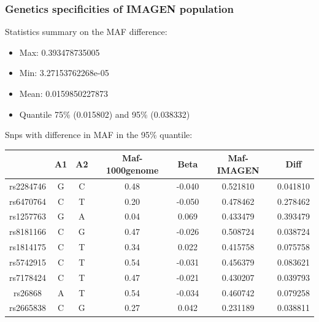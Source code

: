\documentclass[utf8]{beamer}
\begin{document}
\begin{frame}
\frametitle{Genetics specificities of IMAGEN population }

Statistics summary on the MAF difference:
\tiny
\begin{itemize}
\item Max:  0.393478735005
\item Min:  3.27153762268e-05
\item Mean:  0.0159850227873
\item Quantile 75\% (0.015802) and 95\% (0.038332)
\end{itemize}

\vspace{0.5cm}
\normalsize
Snps with difference in MAF in the 95\% quantile:\\
\vspace{0.5cm}
\tiny
\begin{tabular}{|c|c|c|c|c|c|c|}
\hline     &  A1 &  A2 &  Maf-1000genome &   Beta     & Maf-IMAGEN   &   Diff \\
\hline
\hline rs2284746 & G & C & 0.48 &-0.040 & 0.521810 & 0.041810 \\
\hline rs6470764 & C & T & 0.20 &-0.050  &  0.478462 & 0.278462 \\
\hline rs1257763 & G & A & 0.04 & 0.069  &  0.433479 & 0.393479 \\
\hline rs8181166 & C & G & 0.47 &-0.026  &  0.508724 & 0.038724 \\
\hline rs1814175 & C & T & 0.34 & 0.022  &  0.415758 & 0.075758 \\
\hline rs5742915 & C & T & 0.54 &-0.031  &  0.456379 & 0.083621 \\
\hline rs7178424 & C & T & 0.47 &-0.021  &  0.430207 & 0.039793 \\
\hline rs26868   & A & T & 0.54 &-0.034    &  0.460742 &  0.079258 \\
\hline rs2665838 & C & G & 0.27 & 0.042  &  0.231189 & 0.038811 \\
\hline
\end{tabular} 
\end{frame}
\end{document}
